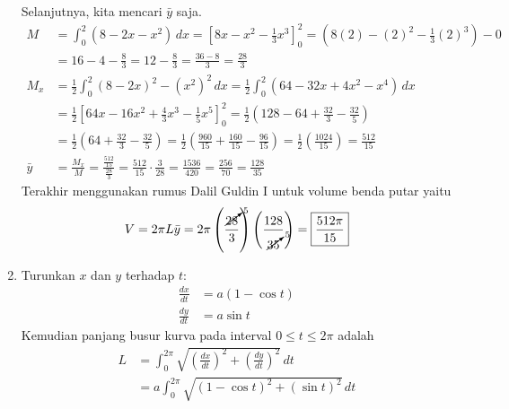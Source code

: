 \documentclass[11pt,openany,a4paper]{article}
\begin{document}
\begin{enumerate}
\begin{center}
        \end{center}
        Selanjutnya, kita mencari $\bar{y}$ saja.
        \begin{align*}
            M &= \int_{0}^{2} (8 - 2x - x^2) \, dx = \left[ 8x - x^2 - \frac{1}{3}x^3 \right]_{0}^{2} = \left( 8(2) - (2)^2 - \frac{1}{3}(2)^3 \right) - 0 \\
            &= 16 - 4 - \frac{8}{3} = 12 - \frac{8}{3} = \frac{36-8}{3} = \frac{28}{3}\\
            M_x &= \frac{1}{2}\int_{0}^{2} (8 - 2x)^2-(x^2)^2 \, dx = \frac{1}{2}\int_{0}^{2} (64 - 32x + 4x^2 - x^4) \, dx \\
            &= \frac{1}{2}\left[ 64x - 16x^2 + \frac{4}{3}x^3 - \frac{1}{5}x^5 \right]_{0}^{2} = \frac{1}{2}\left( 128 - 64 + \frac{32}{3} - \frac{32}{5} \right)\\
            &= \frac{1}{2}\left( 64 + \frac{32}{3} - \frac{32}{5} \right) = \frac{1}{2}\left( \frac{960}{15} + \frac{160}{15} - \frac{96}{15} \right) = \frac{1}{2}\left( \frac{1024}{15} \right) = \frac{512}{15}\\
            \bar{y} &= \frac{M_x}{M} = \frac{\frac{512}{15}}{\frac{28}{3}} = \frac{512}{15} \cdot \frac{3}{28} = \frac{1536}{420} = \frac{256}{70} = \frac{128}{35}
        \end{align*}
        Terakhir menggunakan rumus Dalil Guldin I untuk volume benda putar yaitu
        \[
            V = 2\pi L \bar{y} = 2\pi \left(\frac{\cancelto{5}{28}}{3}\right) \left(\frac{128}{\cancelto{5}{35}}\right) = \boxed{\frac{512\pi}{15}}
        \]
      \item Turunkan $x$ dan $y$ terhadap $t$:
        \begin{align*}
            \frac{dx}{dt} &= a(1 - \cos t)\\
            \frac{dy}{dt} &= a\sin t
        \end{align*}
        Kemudian panjang busur kurva pada interval \( 0 \leq t \leq 2\pi \) adalah
        \begin{align*}
            L &= \int_{0}^{2\pi} \sqrt{\left(\frac{dx}{dt}\right)^2 + \left(\frac{dy}{dt}\right)^2} \, dt\\
            &= a\int_{0}^{2\pi} \sqrt{(1 - \cos t)^2 + (\sin t)^2} \, dt\\

\end{align*}
\end{enumerate}
\end{document}
